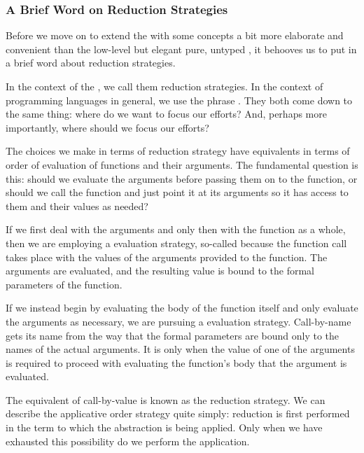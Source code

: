 \subsubsection{A Brief Word on Reduction Strategies}\label{untyped:strategies}
Before we move on to extend the \lambdacalc with some concepts a bit more elaborate and convenient than the low-level but elegant pure, untyped \lambdacalc{}, it behooves us to put in a brief word about reduction strategies.

In the context of the \lambdacalc{}, we call them reduction strategies. In the context of programming languages in general, we use the phrase . They both come down to the same thing: where do we want to focus our efforts? And, perhaps more importantly, where should we focus our efforts? 

The choices we make in terms of \lambdacalc reduction strategy have equivalents in terms of order of evaluation of functions and their arguments. The fundamental question is this: should we evaluate the arguments before passing them on to the function, or should we call the function and just point it at its arguments so it has access to them and their values as needed?

If we first deal with the arguments and only then with the function as a whole, then we are employing a  evaluation strategy, so-called because the function call takes place with the values of the arguments provided to the function. The arguments are evaluated, and the resulting value is bound to the formal parameters of the function.

If we instead begin by evaluating the body of the function itself and only evaluate the arguments as necessary, we are pursuing a  evaluation strategy. Call-by-name gets its name from the way that the formal parameters are bound only to the names of the actual arguments. It is only when the value of one of the arguments is required to proceed with evaluating the function's body that the argument is evaluated.

The \lambdacalc equivalent of call-by-value is known as the  reduction strategy. We can describe the applicative order strategy quite simply: reduction is first performed in the term to which the abstraction is being applied. Only when we have exhausted this possibility do we perform the application.

